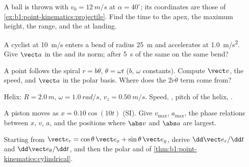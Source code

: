 \begin{exercise}[$\star$]\label{exo:b1:point-kinematics:4}
A ball is thrown with $v_0 = \qty{12}{m/s}$ at $\alpha = 40^\circ$; its
coordinates are those of \cref{ex:b1:point-kinematics:projectile}.
Find the time to the apex, the maximum height, the range, and the
 at landing.
\end{exercise}

\begin{exercise}[$\star\star$]\label{exo:b1:point-kinematics:5}
A cyclist at \qty{10}{m/s} enters a bend of radius \qty{25}{m} and
accelerates at \qty{1.0}{m/s^2}. Give $\vect a$ in the  and
its norm; after \qty{5}{s} of the same  on the same bend?
\end{exercise}

\begin{exercise}[$\star\star$]\label{exo:b1:point-kinematics:6}
A point follows the spiral $r = b\theta$, $\theta = \omega t$ ($b$,
$\omega$ constants). Compute $\vect v$, the speed, and $\vect a$ in the
polar basis. Where does the $2\dot r\dot\theta$ term come from?
\end{exercise}

\begin{exercise}[$\star\star$]\label{exo:b1:point-kinematics:7}
Helix: $R = \qty{2.0}{m}$, $\omega = \qty{1.0}{rad/s}$, $v_z = \qty{0.50}{m/s}$.
Speed, , pitch of the helix, .
\end{exercise}

\begin{exercise}[$\star\star$]\label{exo:b1:point-kinematics:8}
A piston moves as $x = 0.10\cos(10t)$ (SI). Give $v_{\max}$, $a_{\max}$,
the phase relations between $x$, $v$, $a$, and the positions where
$\abs v$ and $\abs a$ are largest.
\end{exercise}

\begin{exercise}[$\star\star$]\label{exo:b1:point-kinematics:9}
Starting from $\vect e_r = \cos\theta\,\vect e_x + \sin\theta\,\vect e_y$,
derive $\dd\vect e_r/\dd t$ and $\dd\vect e_\theta/\dd t$, and then the
polar  and  of \cref{thm:b1:point-kinematics:cylindrical}.
\end{exercise}

